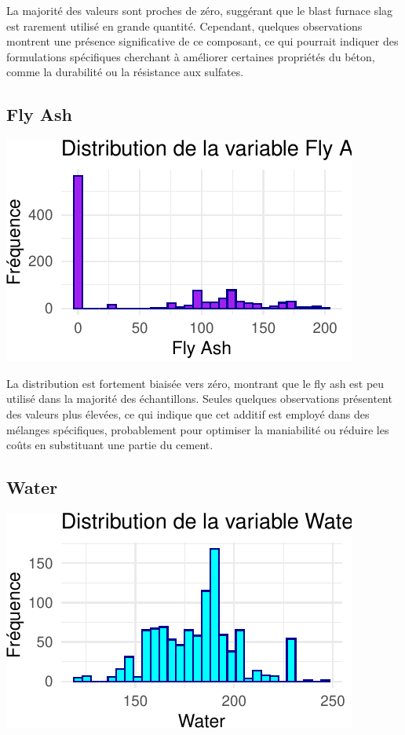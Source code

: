 \documentclass[
  12pt,
]{article}
\begin{document}
La majorité des valeurs sont proches de zéro, suggérant que le blast
furnace slag est rarement utilisé en grande quantité. Cependant,
quelques observations montrent une présence significative de ce
composant, ce qui pourrait indiquer des formulations spécifiques
cherchant à améliorer certaines propriétés du béton, comme la durabilité
ou la résistance aux sulfates.

\subsection{Fly Ash}\label{fly-ash}

\begin{center}\includegraphics{rmd_final_files/figure-latex/unnamed-chunk-2-1} \end{center}

La distribution est fortement biaisée vers zéro, montrant que le fly ash
est peu utilisé dans la majorité des échantillons. Seules quelques
observations présentent des valeurs plus élevées, ce qui indique que cet
additif est employé dans des mélanges spécifiques, probablement pour
optimiser la maniabilité ou réduire les coûts en substituant une partie
du cement.

\subsection{Water}\label{water}

\begin{center}\includegraphics{rmd_final_files/figure-latex/unnamed-chunk-3-1} \end{center}
\end{document}
